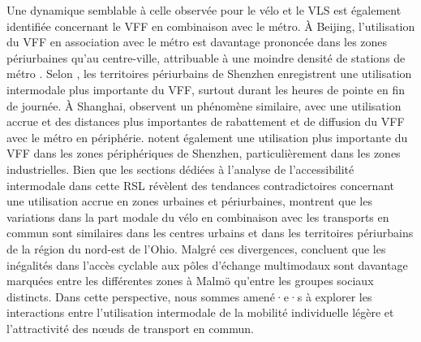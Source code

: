 \begin{refsegment}
Une dynamique semblable à celle observée pour le vélo et le \acrshort{VLS} est également identifiée concernant le \acrshort{VFF} en combinaison avec le métro. À Beijing, l'utilisation du \acrshort{VFF} en association avec le métro est davantage prononcée dans les zones périurbaines qu'au centre-ville, attribuable à une moindre densité de stations de métro \textcolor{blue}{\autocite[13]{fan_dockless_2020}}. Selon \textcolor{blue}{\textcite[24]{guo_dockless_2021}}, les territoires périurbains de Shenzhen enregistrent une utilisation intermodale plus importante du \acrshort{VFF}, surtout durant les heures de pointe en fin de journée. À Shanghai, \textcolor{blue}{\textcite[12]{hu_examining_2022}} observent un phénomène similaire, avec une utilisation accrue et des distances plus importantes de rabattement et de diffusion du \acrshort{VFF} avec le métro en périphérie. \textcolor{blue}{\textcite[389]{guo_role_2021}} notent également une utilisation plus importante du \acrshort{VFF} dans les zones périphériques de Shenzhen, particulièrement dans les zones industrielles. Bien que les sections dédiées à l'analyse de l'accessibilité intermodale dans cette \acrshort{RSL} révèlent des tendances contradictoires concernant une utilisation accrue en zones urbaines et périurbaines, \textcolor{blue}{\textcite[159]{flamm_changes_2014}} montrent que les variations dans la part modale du vélo en combinaison avec les transports en commun sont similaires dans les centres urbains et dans les territoires périurbains de la région du nord-est de l'Ohio. Malgré ces divergences, \textcolor{blue}{\textcite[685]{hamidi_inequalities_2019}} concluent que les inégalités dans l'accès cyclable aux pôles d'échange multimodaux sont davantage marquées entre les différentes zones à Malmö qu'entre les groupes sociaux distincts. Dans cette perspective, nous sommes amené·e·s à explorer les interactions entre l'utilisation intermodale de la mobilité individuelle légère et l'attractivité des nœuds de transport en commun.%
        

\end{refsegment}
